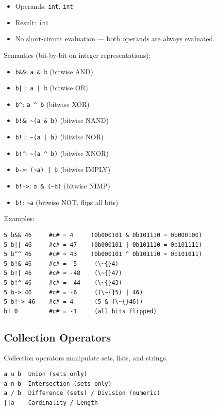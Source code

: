 \begin{itemize}
\item Operands: \texttt{int}, \texttt{int}
\item Result: \texttt{int}
\item No short-circuit evaluation — both operands are always evaluated.
\end{itemize}

Semantics (bit-by-bit on integer representations):
\begin{itemize}
\item \texttt{b\&\&}: \texttt{a \& b} (bitwise AND)
\item \texttt{b||}: \texttt{a | b} (bitwise OR)
\item \texttt{b\^{}}: \texttt{a \^{} b} (bitwise XOR)
\item \texttt{b!\&}: \texttt{\~{}(a \& b)} (bitwise NAND)
\item \texttt{b!|}: \texttt{\~{}(a | b)} (bitwise NOR)
\item \texttt{b!\^{}}: \texttt{\~{}(a \^{} b)} (bitwise XNOR)
\item \texttt{b->}: \texttt{(\~{}a) | b} (bitwise IMPLY)
\item \texttt{b!->}: \texttt{a \& (\~{}b)} (bitwise NIMP)
\item \texttt{b!}: \texttt{\~{}a} (bitwise NOT, flips all bits)
\end{itemize}

Examples:
\begin{verbatim}
5 b&& 46     #c# = 4     (0b000101 & 0b101110 = 0b000100)
5 b|| 46     #c# = 47    (0b000101 | 0b101110 = 0b101111)
5 b^^ 46     #c# = 43    (0b000101 ^ 0b101110 = 0b101011)
5 b!& 46     #c# = -5     (\~{}4)
5 b!| 46     #c# = -48    (\~{}47)
5 b!^ 46     #c# = -44    (\~{}43)
5 b-> 46     #c# = -6     ((\~{}5) | 46)
5 b!-> 46    #c# = 4      (5 & (\~{}46))
b! 0         #c# = -1     (all bits flipped)
\end{verbatim}

\subsection{Collection Operators}
Collection operators manipulate sets, lists, and strings.
\begin{verbatim}
a u b  Union (sets only)
a n b  Intersection (sets only)
a / b  Difference (sets) / Division (numeric)
||a    Cardinality / Length
\end{verbatim}

